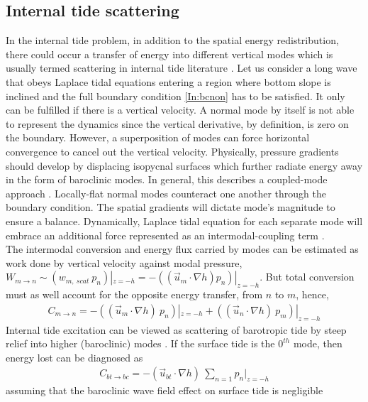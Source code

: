 \documentclass[12pt]{article}
\begin{document}
\subsection{Internal tide scattering}
In the internal tide problem, in addition to the spatial energy redistribution, there could occur a 
transfer of energy into different vertical modes which is usually termed scattering in internal 
tide literature \citep[e.g.][]{muller1992scattering}. Let us consider a long wave that obeys 
Laplace tidal equations entering a region where bottom slope is inclined and the full boundary 
condition \eqref{In:bcnon} has to be satisfied. It only can be fulfilled if there is a vertical 
velocity. A normal mode by itself is not able to represent the dynamics since the vertical 
derivative, by definition, is zero on the boundary. However, a superposition of modes can force 
horizontal convergence to cancel out the vertical velocity. Physically, pressure gradients should 
develop by displacing isopycnal surfaces which further radiate energy away in the form of 
baroclinic modes. In general, this describes a coupled-mode approach \citep{griffiths2007internal}. 
Locally-flat normal modes counteract one another through the boundary condition. The spatial 
gradients will dictate mode's magnitude to ensure a balance. Dynamically, Laplace tidal equation 
for each separate mode will embrace an additional force represented as an intermodal-coupling term 
\citep{griffiths2007internal, kelly2016coupled}.\\
The intermodal conversion and energy flux carried by modes can be estimated as work done by 
vertical velocity against modal pressure, $W_{m \to n} \sim (w_{m,~scat}~p_n)|_{z = 
-h} = -((\vec{u}_m \cdot \nabla h) p_n)|_{z = -h}$. But total conversion must as well account for 
the opposite energy transfer, from $n$ to $m$, hence,
\begin{align}
\label{In:en.trans}
C_{m \to n} = -((\vec{u}_m \cdot \nabla h)~p_n)|_{z = -h} + ((\vec{u}_n \cdot \nabla h)~p_m)|_{z = 
-h}
\end{align}
Internal tide excitation can be viewed as scattering of barotropic tide by steep relief into higher 
(baroclinic) modes \citep{hendershott1981long}. If the surface tide is the $0^{th}$ mode, then 
energy lost can be diagnosed as
\begin{align}
\label{In:bt_bc}
C_{bt \to bc} = -(\vec{u}_{bt} \cdot \nabla h)~\sum_{n = 1} p_n|_{z = -h}
\end{align}
assuming that the baroclinic wave field effect on surface tide is negligible 
\end{document}
